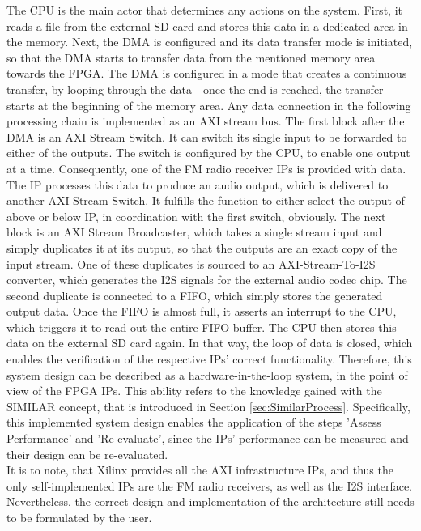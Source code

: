 The CPU is the main actor that determines any actions on the system.
First, it reads a file from the external SD card and stores this data in a dedicated area in the memory.
Next, the DMA is configured and its data transfer mode is initiated, so that the DMA starts to transfer data from the mentioned memory area towards the FPGA.
The DMA is configured in a mode that creates a continuous transfer, by looping through the data - once the end is reached, the transfer starts at the beginning of the memory area.
Any data connection in the following processing chain is implemented as an AXI stream bus.
The first block after the DMA is an AXI Stream Switch.
It can switch its single input to be forwarded to either of the outputs.
The switch is configured by the CPU, to enable one output at a time.
Consequently, one of the FM radio receiver IPs is provided with data.
The IP processes this data to produce an audio output, which is delivered to another AXI Stream Switch.
It fulfills the function to either select the output of above or below IP, in coordination with the first switch, obviously.
The next block is an AXI Stream Broadcaster, which takes a single stream input and simply duplicates it at its output, so that the outputs are an exact copy of the input stream.
One of these duplicates is sourced to an AXI-Stream-To-I2S converter, which generates the I2S signals for the external audio codec chip.
The second duplicate is connected to a FIFO, which simply stores the generated output data.
Once the FIFO is almost full, it asserts an interrupt to the CPU, which triggers it to read out the entire FIFO buffer.
The CPU then stores this data on the external SD card again.
In that way, the loop of data is closed, which enables the verification of the respective IPs' correct functionality.
Therefore, this system design can be described as a hardware-in-the-loop system, in the point of view of the FPGA IPs.
This ability refers to the knowledge gained with the SIMILAR concept, that is introduced in Section \ref{sec:SimilarProcess}.
Specifically, this implemented system design enables the application of the steps 'Assess Performance' and 'Re-evaluate', since the IPs' performance can be measured and their design can be re-evaluated.\\

It is to note, that Xilinx provides all the AXI infrastructure IPs, and thus the only self-implemented IPs are the FM radio receivers, as well as the I2S interface.
Nevertheless, the correct design and implementation of the architecture still needs to be formulated by the user.

